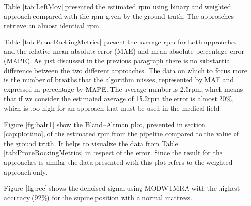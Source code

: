 Table \ref{tab:LeftMov} presented the estimated rpm using binary and weighted approach compared with the rpm given by the ground truth. The approaches retrieve an almost identical rpm. 

\vspace{0.5cm}


Table \ref{tab:ProneRockingMetrics} present the average rpm for both approaches  
and the relative mean absolute error (MAE) and mean absolute percentage error (MAPE). As just discussed in the previous paragraph there is no substantial difference between the two different approaches. The data on which to focus more is the number of breaths that the algorithm misses, represented by MAE and expressed in percentage by MAPE. The average number is 2.5rpm, which means that if we consider the estimated average of 15.2rpm the error is almost 20\%, which is too high for an approach that must be used in the medical field.



Figure \ref{fig:baln1} show the Bland–Altman plot, presented in section \ref{cap:plottino}, of the estimated rpm from the pipeline compared to the value of the ground truth. It helps to visualize the data from Table \ref{tab:ProneRockingMetrics} in respect of the error. Since the result for the approaches is similar the data presented with this plot refers to the weighted approach only.

Figure \ref{fig:rec} shows the denoised signal using MODWTMRA with the highest accuracy (92\%) for the supine position with a normal mattress.

